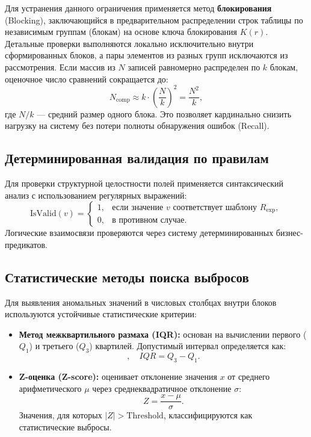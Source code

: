 \documentclass{misisarticle}
\begin{document}
Для устранения данного ограничения применяется метод \textbf{блокирования} (Blocking), заключающийся в предварительном распределении строк таблицы по независимым группам (блокам) на основе ключа блокирования $K(r)$. Детальные проверки выполняются локально исключительно внутри сформированных блоков, а пары элементов из разных групп исключаются из рассмотрения. Если массив из $N$ записей равномерно распределен по $k$ блокам, оценочное число сравнений сокращается до:
\begin{equation}
N_{\text{comp}} \approx k \cdot \left(\frac{N}{k}\right)^{\!2} = \frac{N^2}{k},
\end{equation}
где $N/k$ — средний размер одного блока. Это позволяет кардинально снизить нагрузку на систему без потери полноты обнаружения ошибок (Recall).

\subsection{Детерминированная валидация по правилам}
Для проверки структурной целостности полей применяется синтаксический анализ с использованием регулярных выражений:
\begin{equation}
\text{IsValid}(v) = \begin{cases} 
1, & \text{если значение } v \text{ соответствует шаблону } R_{\text{exp}}, \\
0, & \text{в противном случае.}
\end{cases}
\end{equation}
Логические взаимосвязи проверяются через систему детерминированных бизнес-предикатов.

\subsection{Статистические методы поиска выбросов}
Для выявления аномальных значений в числовых столбцах внутри блоков используются устойчивые статистические критерии:
\begin{itemize}
    \item \textbf{Метод межквартильного размаха (IQR):} основан на вычислении первого ($Q_1$) и третьего ($Q_3$) квартилей. Допустимый интервал определяется как:
    \begin{equation}
    [Q_1 - 1.5 \cdot IQR, \; Q_3 + 1.5 \cdot IQR], \quad IQR = Q_3 - Q_1.
    \end{equation}
    \item \textbf{Z-оценка (Z-score):} оценивает отклонение значения $x$ от среднего арифметического $\mu$ через среднеквадратичное отклонение $\sigma$:
    \begin{equation}
    Z = \frac{x - \mu}{\sigma}.
    \end{equation}
    Значения, для которых $|Z| > \text{Threshold}$, классифицируются как статистические выбросы.
\end{itemize}
\end{document}
